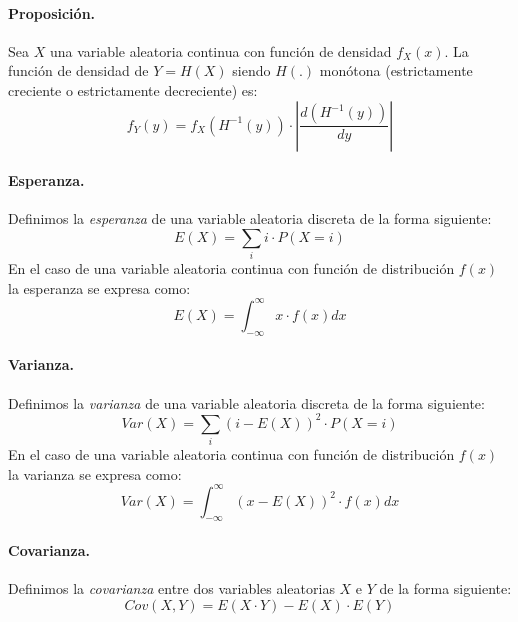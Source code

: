 \paragraph{Proposici\'on.} Sea $X$ una variable aleatoria continua con
funci\'on de densidad $f_X(x)$. La funci\'on de densidad de $Y=H(X)$ siendo 
$H(.)$ mon\'otona (estrictamente creciente o estrictamente decreciente) es:
\begin{displaymath}
f_Y(y) = f_X(H^{-1}(y))\cdot \left| \frac{d(H^{-1}(y))}{dy} \right|
\end{displaymath}

\paragraph{Esperanza.} Definimos la \emph{esperanza} de una
variable aleatoria discreta de la forma siguiente:
\begin{displaymath}
E(X) = \sum_{i} i \cdot P(X=i)
\end{displaymath}
En el caso de una variable aleatoria continua con funci\'on de distribuci\'on 
$f(x)$ la esperanza se expresa como:
\begin{displaymath}
E(X) = \int_{-\infty}^{\infty} x \cdot f(x) dx
\end{displaymath}

\paragraph{Varianza.} Definimos la \emph{varianza} de una variable
aleatoria discreta de la forma siguiente:
\begin{displaymath}
Var(X) = \sum_{i} (i-E(X))^2 \cdot P(X=i)
\end{displaymath}
En el caso de una variable aleatoria continua con funci\'on de distribuci\'on 
$f(x)$ la varianza se expresa como:
\begin{displaymath}
Var(X) = \int_{-\infty}^{\infty} (x-E(X))^2 \cdot f(x) dx
\end{displaymath}

\paragraph{Covarianza.} Definimos la \emph{covarianza} entre dos
variables aleatorias $X$ e $Y$ de la forma siguiente:
\begin{displaymath}
Cov(X,Y) = E(X \cdot Y) - E(X) \cdot E(Y)
\end{displaymath}

